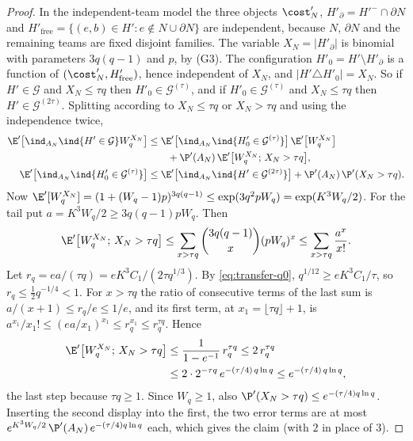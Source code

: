 \begin{proof}
In the independent-team model the three objects $\cost'_N$, $H'_{\partial}=H'^-\cap\partial N$
and $H'_{\mathrm{free}}=\{(e,b)\in H':e\notin N\cup\partial N\}$ are independent, because $N$,
$\partial N$ and the remaining teams are fixed disjoint families. The variable
$X_N=|H'_\partial|$ is binomial with parameters $3q(q-1)$ and $p$, by (G3). The configuration
$H'_0=H'\setminus H'_\partial$ is a function of $(\cost'_N,H'_{\mathrm{free}})$, hence
independent of $X_N$, and $|H'\triangle H'_0|=X_N$. So if $H'\in\mathcal G$ and
$X_N\le\tau q$ then $H'_0\in\mathcal G^{(\tau)}$, and if $H'_0\in\mathcal G^{(\tau)}$ and
$X_N\le\tau q$ then $H'\in\mathcal G^{(2\tau)}$. Splitting according to $X_N\le\tau q$ or
$X_N>\tau q$ and using the independence twice,
\begin{align*}
\E'\bigl[\ind_{A_N}\ind\{H'\in\mathcal G\}W_q^{X_N}\bigr]
&\le\E'\bigl[\ind_{A_N}\ind\{H'_0\in\mathcal G^{(\tau)}\}\bigr]\,\E'\bigl[W_q^{X_N}\bigr]\\
&\qquad+\P'(A_N)\,\E'\bigl[W_q^{X_N};\,X_N>\tau q\bigr],\\
\E'\bigl[\ind_{A_N}\ind\{H'_0\in\mathcal G^{(\tau)}\}\bigr]
&\le\E'\bigl[\ind_{A_N}\ind\{H'\in\mathcal G^{(2\tau)}\}\bigr]+\P'(A_N)\,\P'(X_N>\tau q).
\end{align*}
Now $\E'[W_q^{X_N}]=(1+(W_q-1)p)^{3q(q-1)}\le\exp(3q^2pW_q)=\exp(K^3W_q/2)$. For the tail put
$a=K^3W_q/2\ge3q(q-1)pW_q$. Then
\[
\E'\bigl[W_q^{X_N};\,X_N>\tau q\bigr]\le\sum_{x>\tau q}\binom{3q(q-1)}{x}(pW_q)^x
\le\sum_{x>\tau q}\frac{a^x}{x!}.
\]
Let $r_q=ea/(\tau q)=eK^3C_1/(2\tau q^{1/3})$. By \eqref{eq:transfer-q0},
$q^{1/12}\ge eK^3C_1/\tau$, so $r_q\le\tfrac12q^{-1/4}<1$. For $x>\tau q$ the ratio of
consecutive terms of the last sum is $a/(x+1)\le r_q/e\le1/e$, and its first term, at
$x_1=\lfloor\tau q\rfloor+1$, is $a^{x_1}/x_1!\le(ea/x_1)^{x_1}\le r_q^{x_1}\le r_q^{\tau q}$.
Hence
\begin{align*}
\E'\bigl[W_q^{X_N};\,X_N>\tau q\bigr]&\le\frac{1}{1-e^{-1}}\,r_q^{\tau q}\le2\,r_q^{\tau q}\\
&\le2\cdot2^{-\tau q}\,e^{-(\tau/4)\,q\ln q}\le e^{-(\tau/4)\,q\ln q},
\end{align*}
the last step because $\tau q\ge1$. Since $W_q\ge1$, also
$\P'(X_N>\tau q)\le e^{-(\tau/4)q\ln q}$. Inserting the second display into the first, the two
error terms are at most $e^{K^3W_q/2}\,\P'(A_N)\,e^{-(\tau/4)q\ln q}$ each, which gives the
claim (with $2$ in place of $3$).
\end{proof}


